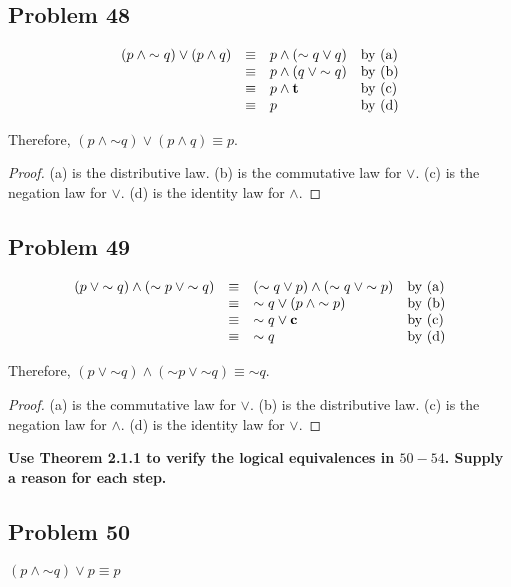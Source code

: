 \documentclass[14pt]{extarticle}
\newcommand{\true}{{\bf t}}
\newcommand{\false}{{\bf c}}
\begin{document}
\subsection{Problem 48}
$$
\begin{array}{rcll}
(p \wedge {\sim q}) \vee (p \wedge q) & \equiv & 
 p \wedge ({\sim q} \vee q) & \text{by (a)} \\
& \equiv & p \wedge (q \vee {\sim q}) & \text{by (b)} \\
& \equiv & p \wedge \true & \text{by (c)} \\
& \equiv & p & \text{by (d)} \\
\end{array}
$$

Therefore, $(p \wedge {\sim q}) \vee (p \wedge q) \equiv p$.

\begin{proof}
(a) is the distributive law. (b) is the commutative law for $\vee$. (c) is the
negation law for $\vee$. (d) is the identity law for $\wedge$.
\end{proof}

\subsection{Problem 49}
$$
\begin{array}{rcll}
(p \vee {\sim q}) \wedge ({\sim p} \vee {\sim q}) & \equiv &
({\sim q} \vee p) \wedge ({\sim q} \vee {\sim p}) & \text{by (a)} \\
& \equiv & {\sim q} \vee (p \wedge {\sim p}) & \text{by (b)} \\
& \equiv & {\sim q} \vee \false & \text{by (c)} \\
& \equiv & {\sim q} & \text{by (d)} \\
\end{array}
$$

Therefore, $(p \vee {\sim q}) \wedge ({\sim p} \vee {\sim q}) \equiv {\sim q}$.

\begin{proof}
(a) is the commutative law for $\vee$. (b) is the distributive law. (c) is the
negation law for $\wedge$. (d) is the identity law for $\vee$.
\end{proof}

{\bf Use Theorem 2.1.1 to verify the logical equivalences in $50-54$. Supply a
reason for each step.}

\subsection{Problem 50}
$(p \wedge {\sim q}) \vee p \equiv p$
\end{document}
